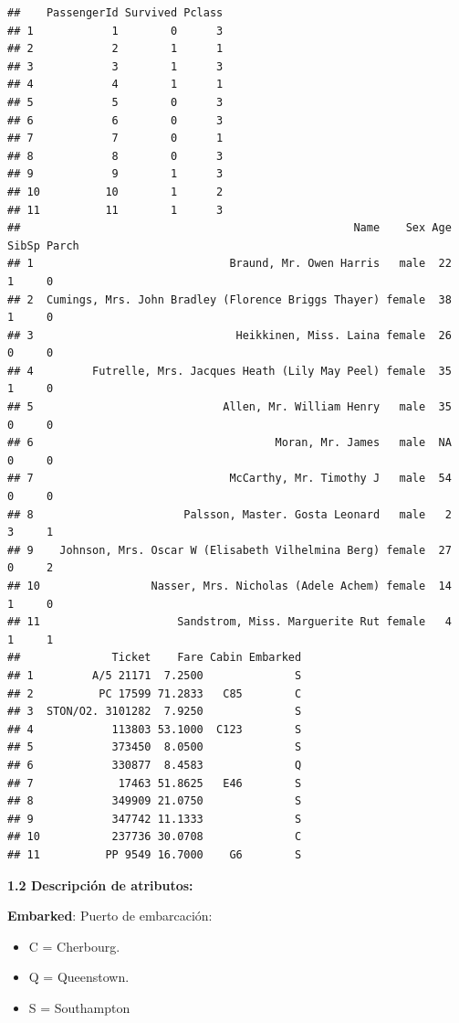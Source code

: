 \documentclass[]{article}
\providecommand{\tightlist}{%
  \setlength{\itemsep}{0pt}\setlength{\parskip}{0pt}}
\begin{document}
\begin{verbatim}
##    PassengerId Survived Pclass
## 1            1        0      3
## 2            2        1      1
## 3            3        1      3
## 4            4        1      1
## 5            5        0      3
## 6            6        0      3
## 7            7        0      1
## 8            8        0      3
## 9            9        1      3
## 10          10        1      2
## 11          11        1      3
##                                                   Name    Sex Age SibSp Parch
## 1                              Braund, Mr. Owen Harris   male  22     1     0
## 2  Cumings, Mrs. John Bradley (Florence Briggs Thayer) female  38     1     0
## 3                               Heikkinen, Miss. Laina female  26     0     0
## 4         Futrelle, Mrs. Jacques Heath (Lily May Peel) female  35     1     0
## 5                             Allen, Mr. William Henry   male  35     0     0
## 6                                     Moran, Mr. James   male  NA     0     0
## 7                              McCarthy, Mr. Timothy J   male  54     0     0
## 8                       Palsson, Master. Gosta Leonard   male   2     3     1
## 9    Johnson, Mrs. Oscar W (Elisabeth Vilhelmina Berg) female  27     0     2
## 10                 Nasser, Mrs. Nicholas (Adele Achem) female  14     1     0
## 11                     Sandstrom, Miss. Marguerite Rut female   4     1     1
##              Ticket    Fare Cabin Embarked
## 1         A/5 21171  7.2500              S
## 2          PC 17599 71.2833   C85        C
## 3  STON/O2. 3101282  7.9250              S
## 4            113803 53.1000  C123        S
## 5            373450  8.0500              S
## 6            330877  8.4583              Q
## 7             17463 51.8625   E46        S
## 8            349909 21.0750              S
## 9            347742 11.1333              S
## 10           237736 30.0708              C
## 11          PP 9549 16.7000    G6        S
\end{verbatim}

\textbf{1.2 Descripción de atributos:}

\textbf{Embarked}: Puerto de embarcación:

\begin{itemize}
\tightlist
\item
  C = Cherbourg.
\item
  Q = Queenstown.
\item
  S = Southampton
\end{itemize}
\end{document}

